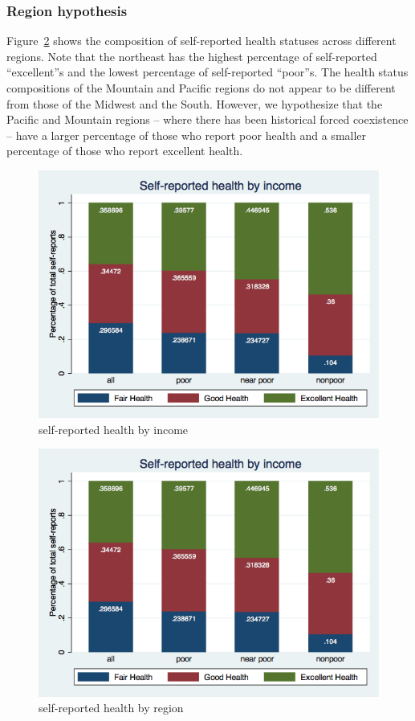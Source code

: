 \documentclass[12pt]{article}
\begin{document}
\subsubsection{Region hypothesis}
Figure~\ref{fig:health_status_by_region} shows the composition of self-reported health statuses across different regions. 
Note that the northeast has the highest percentage of self-reported ``excellent''s and the lowest percentage of self-reported ``poor''s. 
The health status compositions of the Mountain and Pacific regions do not appear to be different from those of the Midwest and the South. 
However, we hypothesize that the Pacific and Mountain regions -- where there has been historical forced coexistence -- have a larger percentage of those who report poor health and a smaller percentage of those who report excellent health.

\begin{figure}[ht!]
\centering
\includegraphics[scale=0.5]{health_status_by_income.png}
\caption{self-reported health by income}
\label{fig:health_status_by_income}
\end{figure}

\begin{figure}[ht!]
\centering
\includegraphics[scale=0.5]{health_status_by_income.png}
\caption{self-reported health by region}
\label{fig:health_status_by_region}
\end{figure}
\end{document}
